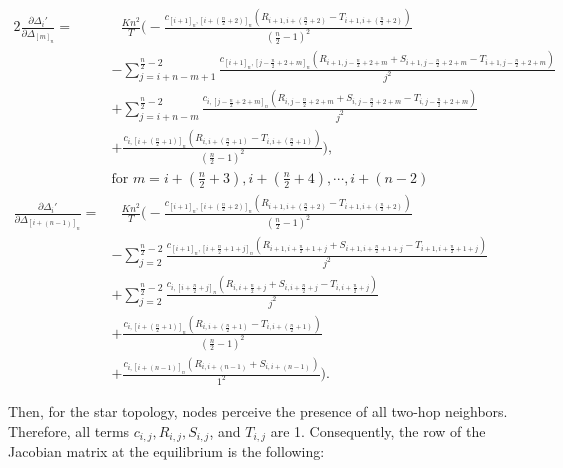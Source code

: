 \begin{alignat}{2}
\frac{\partial \Delta_i'}{\partial \Delta_{[m]_n}} =& \text{ }\frac{Kn^2}{T} \Bigg(- \frac{c_{[i+1]_n,[i+(\frac{n}{2}+2)]_n}(R_{i+1,i+(\frac{n}{2}+2)} - T_{i+1,i+(\frac{n}{2}+2)})}{(\frac{n}{2}-1)^2} \nonumber \\
  &- \sum_{j= i + n -m + 1}^{\frac{n}{2}-2}  \frac{c_{[i+1]_n,[j-\frac{n}{2}+2+m]_n}(R_{i+1,j-\frac{n}{2}+2+m} + S_{i+1,j-\frac{n}{2}+2+m} - T_{i+1,j-\frac{n}{2}+2+m})}{j^2} \nonumber \\
  &+ \sum_{j= i + n - m}^{\frac{n}{2}-2}  \frac{c_{i,[j-\frac{n}{2}+2+m]_n}(R_{i,j-\frac{n}{2}+2+m} + S_{i,j-\frac{n}{2}+2+m} - T_{i,j-\frac{n}{2}+2+m})}{j^2} \nonumber \\
  &+ \frac{c_{i,[i+(\frac{n}{2}+1)]_n}(R_{i,i+(\frac{n}{2}+1)} - T_{i,i+(\frac{n}{2}+1)})}{(\frac{n}{2}-1)^2}\Bigg), \nonumber \\
  &\text{for } m = i+(\frac{n}{2}+3), i+(\frac{n}{2}+4), \cdots, i + (n-2) \nonumber \\
\frac{\partial \Delta_i'}{\partial \Delta_{[i+(n-1)]_n}} =& \text{ }\frac{Kn^2}{T} \Bigg(- \frac{c_{[i+1]_n,[i+(\frac{n}{2}+2)]_n}(R_{i+1,i+(\frac{n}{2}+2)} - T_{i+1,i+(\frac{n}{2}+2)})}{(\frac{n}{2}-1)^2} \nonumber \\
  &- \sum_{j= 2}^{\frac{n}{2}-2}  \frac{c_{[i+1]_n,[i+\frac{n}{2}+1+j]_n}(R_{i+1,i+\frac{n}{2}+1+j} + S_{i+1,i+\frac{n}{2}+1+j} - T_{i+1,i+\frac{n}{2}+1+j})}{j^2} \nonumber \\
  &+ \sum_{j=2}^{\frac{n}{2}-2}  \frac{c_{i,[i+\frac{n}{2}+j]_n}(R_{i,i+\frac{n}{2}+j} + S_{i,i+\frac{n}{2}+j} - T_{i,i+\frac{n}{2}+j})}{j^2} \nonumber \\
  &+ \frac{c_{i,[i+(\frac{n}{2}+1)]_n}(R_{i,i+(\frac{n}{2}+1)} - T_{i,i+(\frac{n}{2}+1)})}{(\frac{n}{2}-1)^2} \nonumber \\
  &+ \frac{c_{i,[i+(n-1)]_n}(R_{i,i+(n-1)} + S_{i,i+(n-1)})}{1^2} \Bigg) \nonumber.
\label{eq:startndiff}
\end{alignat}

Then, for the star topology, nodes perceive the presence of all two-hop neighbors. Therefore, all terms $c_{i,j}, R_{i,j}, S_{i,j}$, and $T_{i,j}$ are 1. Consequently, the row of the Jacobian matrix at the equilibrium is the following: 

